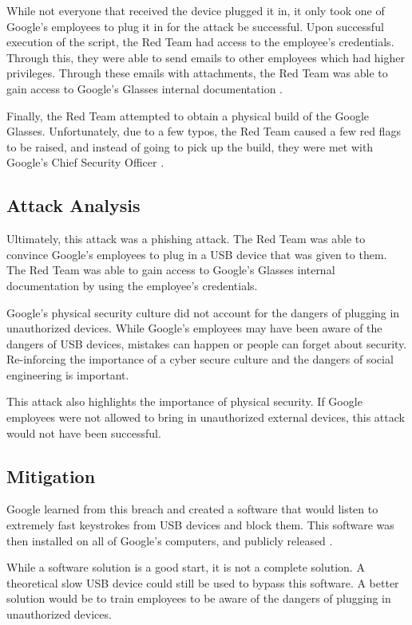 \documentclass[acmsmall]{acmart}
\begin{document}
While not everyone that received the device plugged it in, it only took one of
Google's employees to plug it in for the attack be successful. Upon successful
execution of the script, the Red Team had access to the employee's credentials.
Through this, they were able to send emails to other employees which had higher
privileges. Through these emails with attachments, the Red Team was able to
gain access to Google's Glasses internal documentation \cite{GoogleGlobeVideo}.

Finally, the Red Team attempted to obtain a physical build of the Google Glasses.
Unfortunately, due to a few typos, the Red Team caused a few red flags to be raised,
and instead of going to pick up the build, they were met with Google's Chief Security
Officer \cite{GoogleGlobeVideo}.

\subsection{Attack Analysis}
Ultimately, this attack was a phishing attack. The Red Team was able to convince
Google's employees to plug in a USB device that was given to them. The Red Team
was able to gain access to Google's Glasses internal documentation by using the
employee's credentials.

Google's physical security culture did not account for the dangers of plugging in
unauthorized devices. While Google's employees may have been aware of the dangers
of USB devices, mistakes can happen or people can forget about security.
Re-inforcing the importance of a cyber secure culture and the dangers of social
engineering is important.

This attack also highlights the importance of physical security. If Google employees
were not allowed to bring in unauthorized external devices, this attack would not
have been successful.

\subsection{Mitigation}
Google learned from this breach and created a software that would listen to extremely
fast keystrokes from USB devices and block them. This software was then installed
on all of Google's computers, and publicly released \cite{Google02}.

While a software solution is a good start, it is not a complete solution. A theoretical
slow USB device could still be used to bypass this software. A better solution would
be to train employees to be aware of the dangers of plugging in unauthorized devices.
\end{document}
